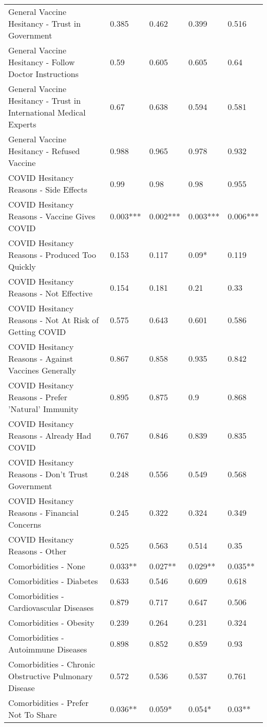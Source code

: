 \begin{table}[ht]
\begin{tabular}{lllll}
  General Vaccine Hesitancy - Trust in Government & 0.385 & 0.462 & 0.399 & 0.516 \\ 
  General Vaccine Hesitancy - Follow Doctor Instructions & 0.59 & 0.605 & 0.605 & 0.64 \\ 
  General Vaccine Hesitancy - Trust in International Medical Experts & 0.67 & 0.638 & 0.594 & 0.581 \\ 
  General Vaccine Hesitancy - Refused Vaccine & 0.988 & 0.965 & 0.978 & 0.932 \\ 
  COVID Hesitancy Reasons - Side Effects & 0.99 & 0.98 & 0.98 & 0.955 \\ 
  COVID Hesitancy Reasons - Vaccine Gives COVID & 0.003*** & 0.002*** & 0.003*** & 0.006*** \\ 
  COVID Hesitancy Reasons - Produced Too Quickly & 0.153 & 0.117 & 0.09* & 0.119 \\ 
  COVID Hesitancy Reasons - Not Effective & 0.154 & 0.181 & 0.21 & 0.33 \\ 
  COVID Hesitancy Reasons - Not At Risk of Getting COVID & 0.575 & 0.643 & 0.601 & 0.586 \\ 
  COVID Hesitancy Reasons - Against Vaccines Generally & 0.867 & 0.858 & 0.935 & 0.842 \\ 
  COVID Hesitancy Reasons - Prefer 'Natural' Immunity & 0.895 & 0.875 & 0.9 & 0.868 \\ 
  COVID Hesitancy Reasons - Already Had COVID & 0.767 & 0.846 & 0.839 & 0.835 \\ 
  COVID Hesitancy Reasons - Don't Trust Government & 0.248 & 0.556 & 0.549 & 0.568 \\ 
  COVID Hesitancy Reasons - Financial Concerns & 0.245 & 0.322 & 0.324 & 0.349 \\ 
  COVID Hesitancy Reasons - Other & 0.525 & 0.563 & 0.514 & 0.35 \\ 
  Comorbidities - None & 0.033** & 0.027** & 0.029** & 0.035** \\ 
  Comorbidities - Diabetes & 0.633 & 0.546 & 0.609 & 0.618 \\ 
  Comorbidities - Cardiovascular Diseases & 0.879 & 0.717 & 0.647 & 0.506 \\ 
  Comorbidities - Obesity & 0.239 & 0.264 & 0.231 & 0.324 \\ 
  Comorbidities - Autoimmune Diseases & 0.898 & 0.852 & 0.859 & 0.93 \\ 
  Comorbidities - Chronic Obstructive Pulmonary Disease & 0.572 & 0.536 & 0.537 & 0.761 \\ 
  Comorbidities - Prefer Not To Share & 0.036** & 0.059* & 0.054* & 0.03** \\ 

\end{tabular}
\end{table}
